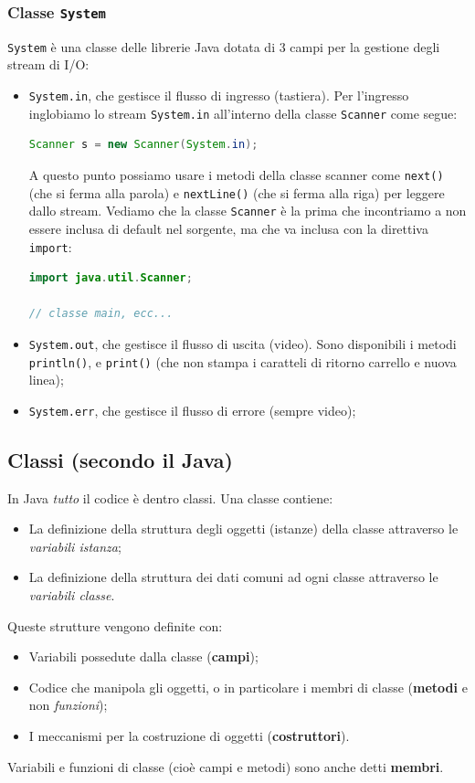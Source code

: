 \documentclass[a4paper,11pt]{article}
\begin{document}
\subsubsection{Classe \lstinline|System|}
\lstinline|System| è una classe delle librerie Java dotata di 3 campi per la gestione degli stream di I/O:
\begin{itemize}
	\item \lstinline|System.in|, che gestisce il flusso di ingresso (tastiera).
		Per l'ingresso inglobiamo lo stream \lstinline|System.in| all'interno della classe \lstinline|Scanner| come segue:
\begin{lstlisting}[language=java, style=codestyle]	
Scanner s = new Scanner(System.in);
\end{lstlisting}
A questo punto possiamo usare i metodi della classe scanner come \lstinline|next()| (che si ferma alla parola) e \lstinline|nextLine()| (che si ferma alla riga) per leggere dallo stream.
Vediamo che la classe \lstinline|Scanner| è la prima che incontriamo a non essere inclusa di default nel sorgente, ma che va inclusa con la direttiva \lstinline|import|:
\begin{lstlisting}[language=java, style=codestyle]	
import java.util.Scanner;

// classe main, ecc... 
\end{lstlisting}
	\item \lstinline|System.out|, che gestisce il flusso di uscita (video). Sono disponibili i metodi \lstinline|println()|, e \lstinline|print()| (che non stampa i caratteli di ritorno carrello e nuova linea);
	\item \lstinline|System.err|, che gestisce il flusso di errore (sempre video);
\end{itemize}

\subsection{Classi (secondo il Java)}
In Java \textit{tutto} il codice è dentro classi.
Una classe contiene:
\begin{itemize}
	\item La definizione della struttura degli oggetti (istanze) della classe attraverso le \textit{variabili istanza};
	\item La definizione della struttura dei dati comuni ad ogni classe attraverso le \textit{variabili classe}.
\end{itemize}
Queste strutture vengono definite con:
\begin{itemize}
	\item Variabili possedute dalla classe (\textbf{campi});
	\item Codice che manipola gli oggetti, o in particolare i membri di classe (\textbf{metodi} e non \textit{funzioni});
	\item I meccanismi per la costruzione di oggetti (\textbf{costruttori}).
\end{itemize}
Variabili e funzioni di classe (cioè campi e metodi) sono anche detti \textbf{membri}.
\end{document}
